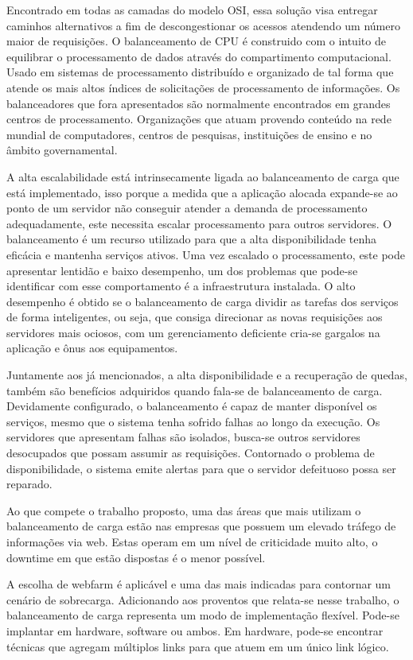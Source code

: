 Encontrado em todas as camadas do modelo OSI, essa solução visa entregar caminhos alternativos a fim de descongestionar
os acessos atendendo um número maior de requisições. O balanceamento de CPU é construido com o intuito de equilibrar o
processamento de dados através do compartimento computacional. Usado em sistemas de processamento distribuído e 
organizado de tal forma que atende os mais altos índices de solicitações de processamento de informações. Os 
balanceadores que fora apresentados são normalmente encontrados em grandes centros de processamento. Organizações 
que atuam provendo conteúdo na rede mundial de computadores, centros de pesquisas, instituições de ensino e no âmbito
governamental.


A alta escalabilidade está intrinsecamente ligada ao balanceamento de carga que está implementado, isso porque a medida 
que a aplicação alocada expande-se ao ponto de um servidor não conseguir atender a demanda de processamento adequadamente,
este necessita escalar processamento para outros servidores. O balanceamento é um recurso utilizado para que a alta
disponibilidade tenha eficácia e mantenha serviços ativos. Uma vez escalado o processamento, este pode apresentar lentidão
e baixo desempenho, um dos problemas que pode-se identificar com esse comportamento é a infraestrutura instalada. 
O alto desempenho é obtido se o balanceamento de carga dividir as tarefas dos serviços de forma inteligentes, ou seja, 
que consiga direcionar as novas requisições aos servidores mais ociosos, com um gerenciamento deficiente cria-se gargalos
na aplicação e ônus aos equipamentos.


Juntamente aos já mencionados, a alta disponibilidade e a recuperação de quedas, também são benefícios adquiridos quando
fala-se de balanceamento de carga. Devidamente configurado, o balanceamento é capaz de manter disponível os serviços, 
mesmo que o sistema tenha sofrido falhas ao longo da execução. Os servidores que apresentam falhas são isolados, 
busca-se outros servidores desocupados que possam assumir as requisições. Contornado o problema de disponibilidade, 
o sistema emite alertas para que o servidor defeituoso possa ser reparado.


Ao que compete o trabalho proposto, uma das áreas que mais utilizam o balanceamento de carga estão nas empresas que 
possuem um elevado tráfego de informações via web. Estas operam em um nível de criticidade muito alto, o downtime em 
que estão dispostas é o menor possível.


A escolha de webfarm é aplicável e uma das mais indicadas para contornar um cenário de sobrecarga. Adicionando aos 
proventos que relata-se  nesse trabalho, o balanceamento de carga representa um modo de implementação flexível. 
Pode-se implantar em hardware, software ou ambos. Em hardware, pode-se encontrar técnicas que agregam múltiplos 
links para que atuem em um único link lógico.


